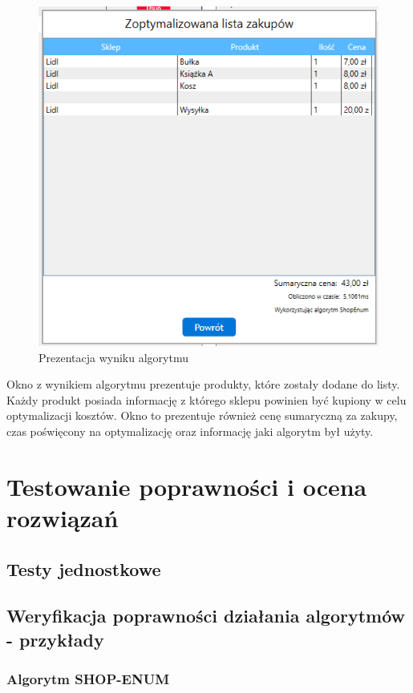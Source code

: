 \documentclass[a4paper]{article}
\let\oldsection\section
\renewcommand\section{\clearpage\oldsection}
\begin{document}
\begin{figure}[H]
\centering
\includegraphics[width=\textwidth,keepaspectratio]{img/modal-optymalizacja.png}
\caption{Prezentacja wyniku algorytmu}
\end{figure}
\begin{flushleft}
Okno z wynikiem algorytmu prezentuje produkty, które zostały dodane do listy. Każdy produkt posiada informację z którego sklepu powinien być kupiony w celu optymalizacji kosztów. Okno to prezentuje również cenę sumaryczną za zakupy, czas poświęcony na optymalizację oraz informację jaki algorytm był użyty.
\end{flushleft}
\section{Testowanie poprawności i ocena rozwiązań}
\subsection{Testy jednostkowe}
\subsection{Weryfikacja poprawności działania algorytmów - przykłady}
\subsubsection{Algorytm SHOP-ENUM}
\end{document}
